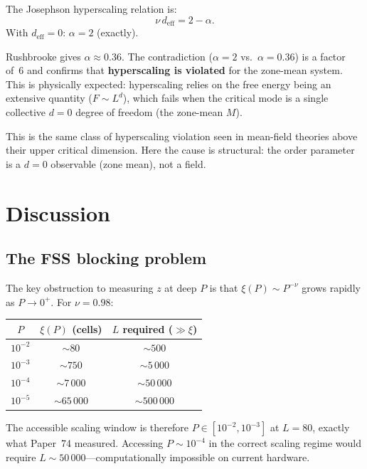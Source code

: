 \documentclass[12pt,a4paper]{article}
\begin{document}
The Josephson hyperscaling relation is:
\begin{equation}
  \nu\, d_\mathrm{eff} = 2 - \alpha.
  \label{eq:josephson}
\end{equation}
With $d_\mathrm{eff}=0$: $\alpha = 2$ (exactly).

Rushbrooke gives $\alpha \approx 0.36$.  The contradiction ($\alpha=2$ vs.\ $\alpha=0.36$) is
a factor of~6 and confirms that \textbf{hyperscaling is violated} for the zone-mean system.
This is physically expected: hyperscaling relies on the free energy being an extensive quantity
($F \sim L^d$), which fails when the critical mode is a single collective $d=0$ degree of
freedom (the zone-mean $M$).

This is the same class of hyperscaling violation seen in mean-field theories above their upper
critical dimension.  Here the cause is structural: the order parameter is a $d=0$ observable
(zone mean), not a field.

\section{Discussion}

\subsection{The FSS blocking problem}

The key obstruction to measuring $z$ at deep $P$ is that $\xi(P) \sim P^{-\nu}$ grows rapidly
as $P \to 0^+$.  For $\nu=0.98$:
\begin{center}
\begin{tabular}{ccc}
\toprule
$P$ & $\xi(P)$ (cells) & $L$ required ($\gg\xi$) \\
\midrule
$10^{-2}$ & $\sim 80$    & $\sim 500$ \\
$10^{-3}$ & $\sim 750$   & $\sim 5\,000$ \\
$10^{-4}$ & $\sim 7\,000$ & $\sim 50\,000$ \\
$10^{-5}$ & $\sim 65\,000$ & $\sim 500\,000$ \\
\bottomrule
\end{tabular}
\end{center}
The accessible scaling window is therefore $P \in [10^{-2}, 10^{-3}]$ at $L=80$, exactly what
Paper~74 measured.  Accessing $P \sim 10^{-4}$ in the correct scaling regime would require
$L \sim 50\,000$---computationally impossible on current hardware.
\end{document}
